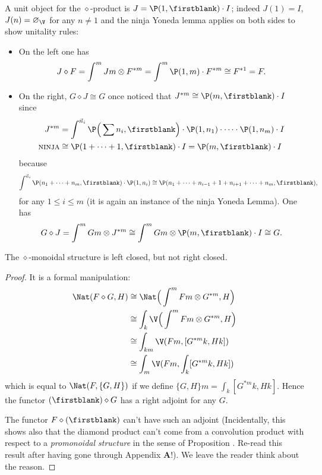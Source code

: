 A unit object for the $\diamond$-product is $J=\P(1,\firstblank)\cdot I$; indeed $J(1)=I$, $J(n)=\varnothing_\V$ for any $n\neq 1$ and the ninja Yoneda lemma applies on both sides to show unitality rules:
\begin{itemize}
 \item On the left one has 
\[
J\diamond F = \int^m Jm\otimes F^{\ast m}=\int^m \P(1,m)\cdot F^{\ast m} \cong F^{\ast 1}=F.
\]
\item On the right, $G\diamond J\cong G$ once noticed that $J^{\ast m}\cong \P(m,\firstblank)\cdot I$ since
\begin{align*}
 J^{\ast m} & = \int^{\vec n_i}\P\Big(\sum n_i,\firstblank\Big)\cdot \P(1,n_1)\cdot\dots\cdot \P(1,n_m)\cdot I\\
\textsc{ninja} &\cong \P(1+\dots+1,\firstblank)\cdot I = \P(m,\firstblank)\cdot I 
\end{align*}
because 
\[\int^{\vec n_i}\P(n_1+\dots+n_m,\firstblank)\cdot \P(1,n_i)\cong \P(n_1+\dots+n_{i-1}+1+n_{i+1}+\dots + n_m,\firstblank),\]
for any $1\le i\le m$ (it is again an instance of the ninja Yoneda Lemma). One has
\[
 G\diamond J = \int^m Gm\otimes J^{\ast m}\cong \int^m Gm\otimes \P(m,\firstblank)\cdot I\cong G.
\]
\end{itemize}
\begin{theorem}
 The $\diamond$-monoidal structure is left closed, but not right closed.
\end{theorem}
\begin{proof}
It is a formal manipulation:
\begin{align*}
\Nat(F\diamond G,H)&\cong \Nat\Big( \int^m Fm\otimes G^{\ast m}, H \Big)\\
&\cong \int_k \V\Big( \int^m Fm\otimes G^{\ast m}, H \Big)\\
&\cong \int_{km}\V(Fm, [G^{\ast m}k,Hk])\\
&\cong \int_m \V(Fm, \int_k[G^{\ast m}k,Hk])
\end{align*}
which is equal to $\Nat(F,\{G,H\})$ if we define $\{G,H\}m=\displaystyle \int_k[G^{\ast m}k,Hk]$. Hence the functor $(\firstblank)\diamond G$ has a right adjoint for any $G$. 

The functor $F\diamond (\firstblank)$ can't have such an adjoint (Incidentally, this shows also that the diamond product can't come from a convolution product with respect to a \emph{promonoidal structure} in the sense of Proposition . Re-read this result after having gone through Appendix \textbf{A}!). We leave the reader think about the reason.
\end{proof}
